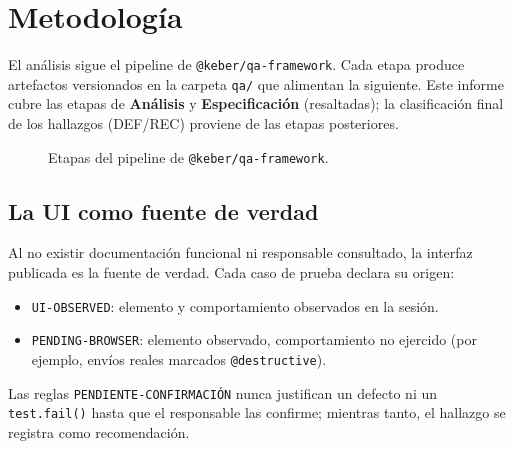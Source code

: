 \documentclass[11pt,a4paper]{article}
\newcommand{\code}[1]{\texttt{#1}}
\begin{document}
\section{Metodología}

El análisis sigue el pipeline de \code{@keber/qa-framework}. Cada etapa produce artefactos
versionados en la carpeta \code{qa/} que alimentan la siguiente. Este informe cubre las
etapas de \textbf{Análisis} y \textbf{Especificación} (resaltadas); la clasificación final de
los hallazgos (DEF/REC) proviene de las etapas posteriores.

\begin{figure}[H]
\centering
{}
\caption{Etapas del pipeline de \code{@keber/qa-framework}.}
\end{figure}

\subsection{La UI como fuente de verdad}
Al no existir documentación funcional ni responsable consultado, la interfaz publicada es la
fuente de verdad. Cada caso de prueba declara su origen:
\begin{itemize}
  \item \code{UI-OBSERVED}: elemento y comportamiento observados en la sesión.
  \item \code{PENDING-BROWSER}: elemento observado, comportamiento no ejercido (por ejemplo,
    envíos reales marcados \code{@destructive}).
\end{itemize}
Las reglas \code{PENDIENTE-CONFIRMACIÓN} nunca justifican un defecto ni un
\code{test.fail()} hasta que el responsable las confirme; mientras tanto, el hallazgo se
registra como recomendación.
\end{document}
